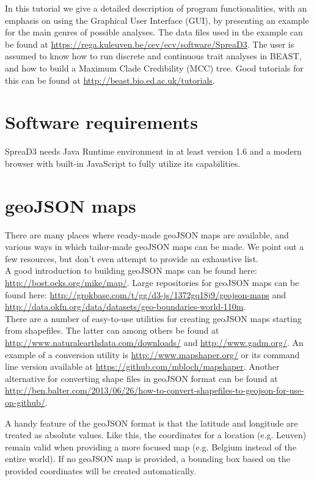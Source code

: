 \documentclass[english]{paper}
\def \spreadname {SpreaD3}
\begin{document}
\par
In this tutorial we give a detailed description of program functionalities, with an emphasis on using the Graphical User Interface (GUI), by presenting an example for the main genres of possible analyses. %
The data files used in the example can be found at  \url{https://rega.kuleuven.be/cev/ecv/software/\spreadname}.
The user is assumed to know how to run discrete and continuous trait analyses in BEAST, and how to build a Maximum Clade Credibility (MCC) tree. 
Good tutorials for this can be found at \url{http://beast.bio.ed.ac.uk/tutorials}.

\section{Software requirements}

{\spreadname} needs Java Runtime environment in at least version 1.6 and a modern browser with built-in JavaScript to fully utilize its capabilities.

\section{geoJSON maps}	

There are many places where ready-made geoJSON maps are available, and various ways in which tailor-made geoJSON maps can be made. 
We point out a few resources, but don't even attempt to provide an exhaustive list.
\\
A good introduction to building geoJSON maps can be found here: \url{http://bost.ocks.org/mike/map/}.
Large repositories for geoJSON maps can be found here:
\url{http://grokbase.com/t/gg/d3-js/1372gq18j9/geojson-maps} and \url{http://data.okfn.org/data/datasets/geo-boundaries-world-110m}.
\\
There are a number of easy-to-use utilities for creating geoJSON maps starting from shapefiles. 
The latter can among others be found at \url{http://www.naturalearthdata.com/downloads/} and \url{http://www.gadm.org/}.
An example of a conversion utility is \url{http://www.mapshaper.org/} or its command line version available at \url{https://github.com/mbloch/mapshaper}.
Another alternative for converting shape files in geoJSON format can be found at \url{http://ben.balter.com/2013/06/26/how-to-convert-shapefiles-to-geojson-for-use-on-github/}.
\par
A handy feature of the geoJSON format is that the latitude and longitude are treated as absolute values.
Like this, the coordinates for a location (e.g. Leuven) remain valid when providing a more focused map (e.g. Belgium instead of the entire world).
If no geoJSON map is provided, a bounding box based on the provided coordinates will be created automatically.
\end{document}
